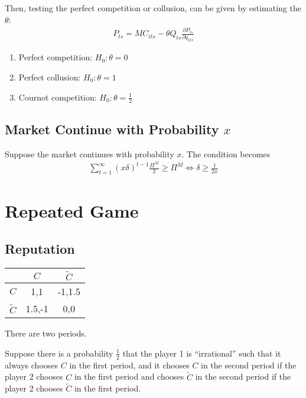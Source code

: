 \documentclass[11pt]{elegantbook}
\begin{document}
Then, testing the perfect competition or collusion, can be given by estimating the $\theta$:
\begin{equation}
    \begin{aligned}
        P_{ts}=MC_{its}-\theta Q_{ts}\frac{\partial P_{ts}}{\partial q_{1ts}}
    \end{aligned}
    \nonumber
\end{equation}
\begin{enumerate}
    \item Perfect competition: $H_0: \theta=0$
    \item Perfect collusion: $H_0: \theta=1$
    \item Cournot competition: $H_0: \theta=\frac{1}{2}$
\end{enumerate}

\subsection{Market Continue with Probability $x$}
Suppose the market continues with probability $x$. The condition becomes
\begin{equation}
    \begin{aligned}
        \sum_{t=1}^\infty (x\delta)^{t-1}\frac{\Pi^M}{2}\geq \Pi^M
        \Leftrightarrow \delta\geq \frac{1}{2x}
    \end{aligned}
    \nonumber
\end{equation}

\section{Repeated Game}
\subsection{Reputation}
\begin{center}
    \begin{tabular}{ccc}
        \hline
            &$C$ &$\tilde{C}$\\
        \hline
            $C$& 1,1&-1,1.5\\
            $\tilde{C}$&1.5,-1 &0,0\\
        \hline
    \end{tabular}
\end{center}
There are two periods.

Suppose there is a probability $\frac{1}{2}$ that the player 1 is ``irrational'' such that it always chooses $C$ in the first period, and it chooses $C$ in the second period if the player 2 chooses $C$ in the first period and chooses $\tilde{C}$ in the second period if the player 2 chooses $\tilde{C}$ in the first period.
\end{document}
